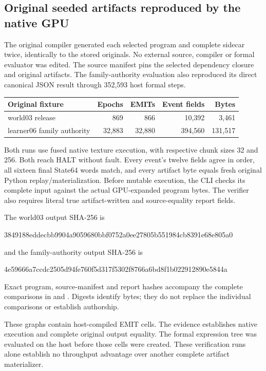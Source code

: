 \subsection{Original seeded artifacts reproduced by the native GPU}
The original compiler generated each selected program and complete sidecar
twice, identically to the stored originals. No external source, compiler
or formal evaluator was edited. The source manifest pins the selected
dependency closure and original artifacts. The family-authority evaluation
also reproduced its direct canonical JSON result through 352,593 host
formal steps.

\begin{center}\small
\begin{tabularx}{\linewidth}{@{}Y r r r r@{}}
\toprule Original fixture & Epochs & EMITs & Event fields & Bytes\\\midrule
world03 release & 869 & 866 & 10,392 & 3,461\\
learner06 family authority & 32,883 & 32,880 & 394,560 & 131,517\\
\bottomrule
\end{tabularx}
\end{center}

Both runs use fused native texture execution, with respective chunk sizes
32 and 256. Both reach HALT without fault. Every event's twelve fields
agree in order, all sixteen final State64 words match, and every artifact
byte equals fresh original Python replay/materialization. Before mutable
execution, the CLI checks its complete input against the actual
GPU-expanded program bytes. The verifier also requires literal true
artifact-written and source-equality report fields.

The world03 output SHA-256 is
\begin{center}\small\ttfamily
3849188eddecbb9904a9059680bbf0752a0ee27805b551984cb8391e68e805a0
\end{center}
and the family-authority output SHA-256 is
\begin{center}\small\ttfamily
4e59666a7ccdc2505d94fe760f5d317f5302f8766a6bd8f1b022912890e5844a
\end{center}
Exact program, source-manifest and report hashes accompany the complete
comparisons in  and
. Digests identify bytes;
they do not replace the individual comparisons or establish authorship.

These graphs contain host-compiled EMIT cells. The evidence establishes
native execution and complete original output equality. The formal
expression tree was evaluated on the host before those cells were created.
These verification runs alone establish no throughput advantage over
another complete artifact materializer.

